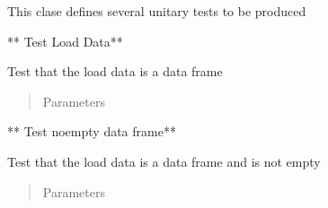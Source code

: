 \documentclass[letterpaper,10pt,english]{sphinxmanual}
\begin{document}
\begin{fulllineitems}
\label{\detokenize{index:dummy_project_test.TestFunction}}
\sphinxAtStartPar
{}

\sphinxAtStartPar
This clase defines several unitary tests to be produced

\begin{fulllineitems}
\label{\detokenize{index:dummy_project_test.TestFunction.test_load_data}}
\sphinxAtStartPar
** Test Load Data**

\sphinxAtStartPar
Test that the load data is a data frame
\begin{quote}\begin{description}
\item[{Parameters}] \leavevmode
\sphinxAtStartPar
{} \textendash{} 

\end{description}\end{quote}

\end{fulllineitems}


\begin{fulllineitems}
\label{\detokenize{index:dummy_project_test.TestFunction.test_load_data_empty}}
\sphinxAtStartPar
** Test no\sphinxhyphen{}empty data frame**

\sphinxAtStartPar
Test that the load data is a data frame and is not empty
\begin{quote}\begin{description}
\item[{Parameters}] \leavevmode
\sphinxAtStartPar
{} \textendash{} 

\end{description}\end{quote}

\end{fulllineitems}


\end{fulllineitems}
\end{document}
